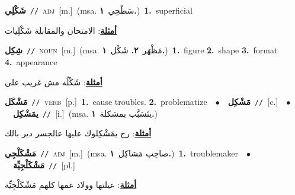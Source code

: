 \documentclass[10pt,a4paper,twoside]{article} %
\begin{document}
\begin{multicols}{2}
{\setlength\topsep{0pt}\textbf{\foreignlanguage{arabic}{شَكْلِي}}\ {\color{gray}\texttt{//}\color{black}}\ \textsc{adj}\ [m.]\ \color{gray}(msa. \foreignlanguage{arabic}{سَطْحِي}~\foreignlanguage{arabic}{\textbf{١.}})\color{black}\ \textbf{1.}~superficial\  \begin{flushright}\color{gray}\foreignlanguage{arabic}{\textbf{\underline{\foreignlanguage{arabic}{أمثلة}}}: الامتحان والمقابلة شَكْلِيات}\end{flushright}\color{black}} \vspace{2mm}

{\setlength\topsep{0pt}\textbf{\foreignlanguage{arabic}{شِكِل}}\ {\color{gray}\texttt{//}\color{black}}\ \textsc{noun}\ [m.]\ \color{gray}(msa. \foreignlanguage{arabic}{مَظْهَر}~\foreignlanguage{arabic}{\textbf{٢.}}  \foreignlanguage{arabic}{شَكْل}~\foreignlanguage{arabic}{\textbf{١.}})\color{black}\ \textbf{1.}~figure  \textbf{2.}~shape  \textbf{3.}~format  \textbf{4.}~appearance\  \begin{flushright}\color{gray}\foreignlanguage{arabic}{\textbf{\underline{\foreignlanguage{arabic}{أمثلة}}}: شَكْلُه مش غريب علي}\end{flushright}\color{black}} \vspace{2mm}

{\setlength\topsep{0pt}\textbf{\foreignlanguage{arabic}{مَشْكَل}}\ {\color{gray}\texttt{//}\color{black}}\ \textsc{verb}\ [p.]\ \textbf{1.}~cause troubles.  \textbf{2.}~problematize\ \ $\bullet$\ \ \setlength\topsep{0pt}\textbf{\foreignlanguage{arabic}{مَشْكِل}}\ {\color{gray}\texttt{//}\color{black}}\ [c.]\ \ $\bullet$\ \ \setlength\topsep{0pt}\textbf{\foreignlanguage{arabic}{يمَشْكِل}}\ {\color{gray}\texttt{//}\color{black}}\ [i.]\ \color{gray}(msa. \foreignlanguage{arabic}{يتَسَبَّب بمشكلة}~\foreignlanguage{arabic}{\textbf{١.}})\color{black}\  \begin{flushright}\color{gray}\foreignlanguage{arabic}{\textbf{\underline{\foreignlanguage{arabic}{أمثلة}}}: رح يمَشْكِلوك عليها عالجسر دير بالك}\end{flushright}\color{black}} \vspace{2mm}

{\setlength\topsep{0pt}\textbf{\foreignlanguage{arabic}{مَشْكَلْجِي}}\ {\color{gray}\texttt{//}\color{black}}\ \textsc{adj}\ [m.]\ \color{gray}(msa. \foreignlanguage{arabic}{صاحِب مَشاكِل}~\foreignlanguage{arabic}{\textbf{١.}})\color{black}\ \textbf{1.}~troublemaker\ \ $\bullet$\ \ \setlength\topsep{0pt}\textbf{\foreignlanguage{arabic}{مَشْكَلْجِيِّة}}\ {\color{gray}\texttt{//}\color{black}}\ [pl.]\  \begin{flushright}\color{gray}\foreignlanguage{arabic}{\textbf{\underline{\foreignlanguage{arabic}{أمثلة}}}: عيلتها وولاد عمها كلهم مَشْكَلْجِيِّة}\end{flushright}\color{black}} \vspace{2mm}


\end{multicols}
\end{document}
